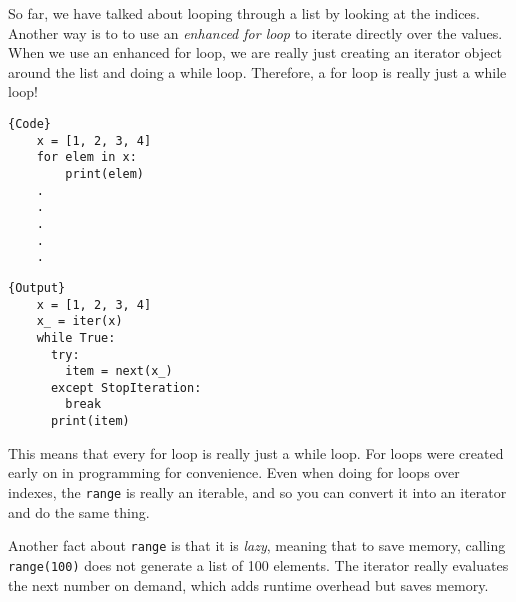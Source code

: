   So far, we have talked about looping through a list by looking at the indices. Another way is to to use an \textit{enhanced for loop} to iterate directly over the values. When we use an enhanced for loop, we are really just creating an iterator object around the list and doing a while loop. Therefore, a for loop is really just a while loop!  

  \noindent\begin{minipage}{.5\textwidth}
  \begin{lstlisting}[]{Code}
    x = [1, 2, 3, 4] 
    for elem in x: 
        print(elem)
    .
    .
    .
    .
    .
  \end{lstlisting}
  \end{minipage}
  \hfill
  \begin{minipage}{.49\textwidth}
  \begin{lstlisting}[]{Output}
    x = [1, 2, 3, 4] 
    x_ = iter(x) 
    while True: 
      try: 
        item = next(x_)
      except StopIteration: 
        break 
      print(item)
  \end{lstlisting}
  \end{minipage}

  This means that every for loop is really just a while loop. For loops were created early on in programming for convenience. Even when doing for loops over indexes, the \texttt{range} is really an iterable, and so you can convert it into an iterator and do the same thing. 

  Another fact about \texttt{range} is that it is \textit{lazy}, meaning that to save memory, calling \texttt{range(100)} does not generate a list of 100 elements. The iterator really evaluates the next number on demand, which adds runtime overhead but saves memory.   

